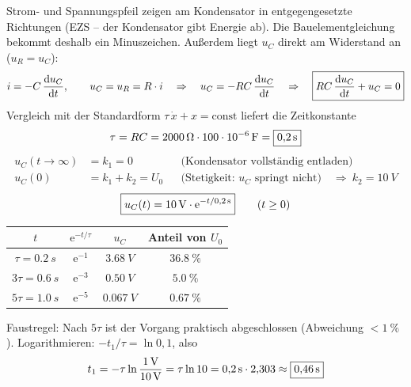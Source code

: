 \documentclass[11pt,a4paper]{article}
\begin{document}
\begin{loesung}
Strom- und Spannungspfeil zeigen am Kondensator in entgegengesetzte Richtungen (EZS -- der Kondensator gibt Energie ab). Die Bauelementgleichung bekommt deshalb ein Minuszeichen. Außerdem liegt $u_C$ direkt am Widerstand an ($u_R = u_C$):
\[
  i = -C\,\frac{\mathrm{d}u_C}{\mathrm{d}t}, \qquad u_C = u_R = R\cdot i
  \quad\Rightarrow\quad u_C = -RC\,\frac{\mathrm{d}u_C}{\mathrm{d}t}
  \quad\Rightarrow\quad \boxed{RC\,\frac{\mathrm{d}u_C}{\mathrm{d}t} + u_C = 0}
\]
Vergleich mit der Standardform $\tau\,\dot x + x = \text{const}$ liefert die Zeitkonstante
\[
  \tau = RC = \SI{2000}{\ohm}\cdot\SI{100e-6}{F} = \boxed{\SI{0.2}{s}}
\]
\begin{align*}
  u_C(t\to\infty) &= k_1 = 0 && \text{(Kondensator vollständig entladen)}\\
  u_C(0) &= k_1 + k_2 = U_0 && \text{(Stetigkeit: } u_C \text{ springt nicht)} \quad\Rightarrow\ k_2 = \SI{10}{V}
\end{align*}
\[
  \boxed{u_C(t) = \SI{10}{V}\cdot \mathrm{e}^{-t/\SI{0.2}{s}}} \qquad (t \ge 0)
\]
\begin{center}
\begin{tabular}{cccc}\toprule
 $t$ & $\mathrm{e}^{-t/\tau}$ & $u_C$ & Anteil von $U_0$\\\midrule
 $\tau = \SI{0.2}{s}$ & $\mathrm{e}^{-1}$ & $\SI{3.68}{V}$ & $\SI{36.8}{\percent}$\\
 $3\tau = \SI{0.6}{s}$ & $\mathrm{e}^{-3}$ & $\SI{0.50}{V}$ & $\SI{5.0}{\percent}$\\
 $5\tau = \SI{1.0}{s}$ & $\mathrm{e}^{-5}$ & $\SI{0.067}{V}$ & $\SI{0.67}{\percent}$\\\bottomrule
\end{tabular}
\end{center}
Faustregel: Nach $5\tau$ ist der Vorgang praktisch abgeschlossen (Abweichung $< \SI{1}{\percent}$).
Logarithmieren: $-t_1/\tau = \ln 0{,}1$, also
\[
  t_1 = -\tau\ln\frac{\SI{1}{V}}{\SI{10}{V}} = \tau\ln 10 = \SI{0.2}{s}\cdot 2{,}303 \approx \boxed{\SI{0.46}{s}}
\]
\end{loesung}
\end{document}
